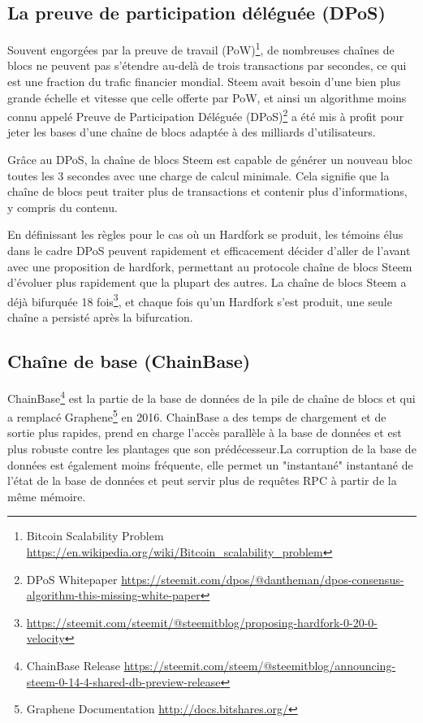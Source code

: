 \documentclass[11pt]{article}
\begin{document}
\subsection{La preuve de participation déléguée (DPoS)}
\label{sec:org8738ddc}
Souvent engorgées par la preuve de travail (PoW)\footnote{Bitcoin Scalability Problem
\url{https://en.wikipedia.org/wiki/Bitcoin\_scalability\_problem}}, de
nombreuses chaînes de blocs ne peuvent pas s'étendre au-delà de
trois transactions par secondes, ce qui est une fraction du trafic
financier mondial. Steem avait besoin d'une bien plus grande
échelle et vitesse que celle offerte par PoW, et ainsi un
algorithme moins connu appelé Preuve de Participation Déléguée
(DPoS)\footnote{DPoS Whitepaper
\url{https://steemit.com/dpos/@dantheman/dpos-consensus-algorithm-this-missing-white-paper}} a été mis à profit pour jeter les bases d'une
chaîne de blocs adaptée à des milliards d'utilisateurs. 

Grâce au DPoS, la chaîne de blocs Steem est capable de générer un nouveau
bloc toutes les 3 secondes avec une charge de calcul minimale. Cela
signifie que la chaîne de blocs peut traiter plus de transactions et
contenir plus d'informations, y compris du contenu.

En définissant les règles pour le cas où un Hardfork se produit,
les témoins élus dans le cadre DPoS peuvent rapidement et
efficacement décider d'aller de l'avant avec une proposition
de hardfork, permettant au protocole chaîne de blocs Steem d'évoluer plus
rapidement que la plupart des autres. La chaîne de blocs Steem a déjà
bifurquée 18 fois\footnote{\url{https://steemit.com/steemit/@steemitblog/proposing-hardfork-0-20-0-velocity}}, et chaque fois qu'un Hardfork s'est
produit, une seule chaîne a persisté après la bifurcation.
\subsection{Chaîne de base (ChainBase)}
\label{sec:org4ec419b}
ChainBase\footnote{ChainBase Release
\url{https://steemit.com/steem/@steemitblog/announcing-steem-0-14-4-shared-db-preview-release}} est la partie de la base de données de la pile
de chaîne de blocs et qui a remplacé Graphene\footnote{Graphene Documentation \url{http://docs.bitshares.org/}}
en 2016. ChainBase a des temps de chargement et de sortie plus
rapides, prend en charge l'accès parallèle à la base de données et
est plus robuste contre les plantages que son prédécesseur.La
corruption de la base de données est également moins fréquente,
elle permet un "instantané" instantané de l'état de la base de
données et peut servir plus de requêtes RPC à partir de la même
mémoire.  
\end{document}
